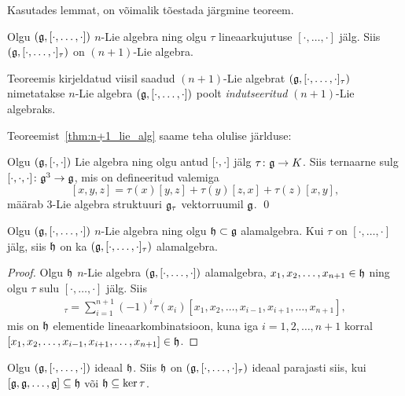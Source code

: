 Kasutades lemmat, on võimalik tõestada järgmine teoreem. \cite{AKMS:2014}

\begin{thm}\label{thm:n+1_lie_alg}
    Olgu $(\mathfrak{g}, [\cdot, \dots, \cdot])$ $n$-Lie algebra ning olgu $\tau$
    lineaarkujutuse $[\cdot, \dots, \cdot]$ jälg. Siis
    $(\mathfrak{g}, [\cdot, \dots, \cdot]_\tau)$ on $(n+1)$-Lie algebra.
\end{thm}

Teoreemis kirjeldatud viisil saadud $(n+1)$-Lie algebrat
$(\mathfrak{g}, [\cdot, \dots, \cdot]_\tau)$ nimetatakse $n$-Lie algebra
$(\mathfrak{g}, [\cdot, \dots, \cdot])$ poolt \emph{indutseeritud}
$(n+1)$-Lie algebraks.

Teoreemist~\ref{thm:n+1_lie_alg} saame teha olulise järlduse:

\begin{jar}
    Olgu $(\mathfrak{g}, \left[ \cdot, \cdot \right])$ Lie algebra ning olgu antud
    $\left[ \cdot, \cdot \right]$ jälg $\tau \colon \mathfrak{g} \to K$. Siis ternaarne sulg
    $[ \cdot, \cdot, \cdot ] \colon \mathfrak{g}^3 \to \mathfrak{g}$, mis on defineeritud
    valemiga
    \[
        [x, y, z] = \tau(x)[y, z] + \tau(y)[z, x] + \tau(z)[x, y],
    \]
    määrab $3$-Lie algebra struktuuri $\mathfrak{g}_\tau$ vektorruumil $\mathfrak{g}$.
    \hfill \qed
\end{jar}

\begin{lau}\label{lause:indutseeritud-alamalgebra}
    Olgu $(\mathfrak{g}, [\cdot, \dots, \cdot])$ $n$-Lie algebra ning olgu
    $\mathfrak{h} \subset \mathfrak{g}$ alamalgebra. Kui $\tau$ on $[\cdot, \dots, \cdot]$ jälg,
    siis $\mathfrak{h}$ on ka $(\mathfrak{g}, [\cdot, \dots, \cdot]_\tau)$ alamalgebra.
\end{lau}

\begin{proof}
    Olgu $\mathfrak{h}$ $n$-Lie algebra $(\mathfrak{g}, [\cdot, \dots, \cdot])$ alamalgebra,
    $x_1, x_2, \dots, x_{n+1} \in \mathfrak{h}$ ning olgu $\tau$ sulu
    $[\cdot, \dots, \cdot]$ jälg. Siis
    \begin{align*}
        [x_1, x_2, \dots, x_{n+1}]_\tau =  \sum_{i=1}^{n+1} (-1)^i \tau(x_i)
        [x_1, x_2, \dots, x_{i-1}, x_{i+1}, \dots, x_{n+1}],
    \end{align*}
    mis on $\mathfrak{h}$ elementide lineaarkombinatsioon, kuna iga
    $i = 1, 2, \dots, n+1$ korral
    $[x_1, x_2, \dots, x_{i-1}, x_{i+1}, \dots, x_{n+1}] \in \mathfrak{h}$.
\end{proof}

\begin{lau}\label{lause:indutseeritud-ideaal}
    Olgu $(\mathfrak{g}, [\cdot, \dots, \cdot])$ ideaal $\mathfrak{h}$. Siis $\mathfrak{h}$ on
    $(\mathfrak{g}, [\cdot, \dots, \cdot]_\tau)$ ideaal parajasti siis, kui
    $[\mathfrak{g}, \mathfrak{g}, \dots, \mathfrak{g}] \subseteq \mathfrak{h}$ või $\mathfrak{h} \subseteq \ker \tau$.
\end{lau}

